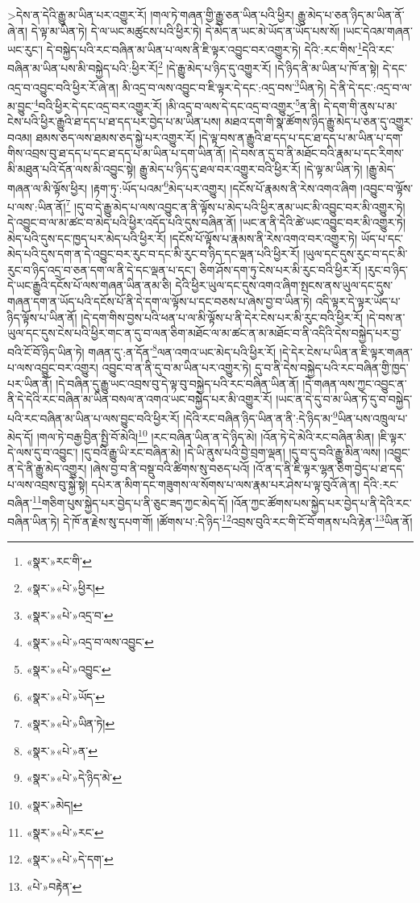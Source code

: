  >དེས་ན་དེའི་རྒྱུ་མ་ཡིན་པར་འགྱུར་རོ། །གལ་ཏེ་གཞན་གྱི་རྒྱུ་ཅན་ཡིན་པའི་ཕྱིར། རྒྱུ་མེད་པ་ཅན་ཉིད་མ་ཡིན་ནོ་ཞེ་ན། དེ་ལྟ་མ་ཡིན་ཏེ། དེ་ལ་ཡང་མཚུངས་པའི་ཕྱིར་ཏེ། དེ་མེད་ན་ཡང་མེ་ཡོད་ན་ཡོད་པས་སོ། །ཡང་དེའམ་གཞན་ཡང་རུང་། དེ་བསྐྱེད་པའི་རང་བཞིན་མ་ཡིན་པ་ལས་ནི་ཇི་ལྟར་འབྱུང་བར་འགྱུར་ཏེ། དེའི་:རང་གིས་\footnote{«སྣར་»རང་གི་}དེའི་རང་བཞིན་མ་ཡིན་པས་མི་བསྐྱེད་པའི་:ཕྱིར་རོ།\footnote{«སྣར་»«པེ་»ཕྱིར།} །དེ་རྒྱུ་མེད་པ་ཉིད་དུ་འགྱུར་རོ། །དེ་ཉིད་ནི་མ་ཡིན་པ་ཁོ་ན་སྟེ། དེ་དང་འདྲ་བ་འབྱུང་བའི་ཕྱིར་རོ་ཞེ་ན། མི་འདྲ་བ་ལས་འབྱུང་བ་ཇི་ལྟར་དེ་དང་:འདྲ་བས་\footnote{«སྣར་»«པེ་»འདྲ་བ་}ཡིན་ཏེ། དེ་ནི་དེ་དང་:འདྲ་བ་ལ་མ་བྱུང་\footnote{«སྣར་»«པེ་»འདྲ་བ་ལས་འབྱུང་}བའི་ཕྱིར་དེ་དང་འདྲ་བར་འགྱུར་རོ། །མི་འདྲ་བ་ལས་དེ་དང་འདྲ་བ་འགྱུར་\footnote{«སྣར་»«པེ་»འབྱུང་}ན་ནི། དེ་དག་གི་ནུས་པ་མ་ངེས་པའི་ཕྱིར་རྒྱུའི་ཐ་དད་པ་ཐ་དད་པར་བྱེད་པ་མ་ཡིན་པས། མཐའ་དག་གི་སྣ་ཚོགས་ཉིད་རྒྱུ་མེད་པ་ཅན་དུ་འགྱུར་བའམ། ཐམས་ཅད་ལས་ཐམས་ཅད་སྐྱེ་པར་འགྱུར་རོ། །དེ་ལྟ་བས་ན་རྒྱུའི་ཐ་དད་པ་དང་ཐ་དད་པ་མ་ཡིན་པ་དག་གིས་འབྲས་བུ་ཐ་དད་པ་དང་ཐ་དད་པ་མ་ཡིན་པ་དག་ཡིན་ནོ། །དེ་བས་ན་དུ་བ་ནི་མཐོང་བའི་རྣམ་པ་དང་རིགས་མི་མཐུན་པའི་དོན་ལས་མི་འབྱུང་སྟེ། རྒྱུ་མེད་པ་ཉིད་དུ་ཐལ་བར་འགྱུར་བའི་ཕྱིར་རོ། །དེ་ལྟ་མ་ཡིན་ཏེ། །རྒྱུ་མེད་གཞན་ལ་མི་ལྟོས་ཕྱིར། །རྟག་ཏུ་:ཡོད་པའམ་\footnote{«སྣར་»«པེ་»ཡོད་}མེད་པར་འགྱུར། །དངོས་པོ་རྣམས་ནི་རེས་འགའ་ཞིག །འབྱུང་བ་ལྟོས་པ་ལས་:ཡིན་ནོ།\footnote{«སྣར་»«པེ་»ཡིན་ཏེ།} །དུ་བ་དེ་རྒྱུ་མེད་པ་ལས་འབྱུང་ན་ནི་ལྟོས་པ་མེད་པའི་ཕྱིར་ནམ་ཡང་མི་འབྱུང་བར་མི་འགྱུར་ཏེ། དེ་འབྱུང་བ་ལ་མ་ཚང་བ་མེད་པའི་ཕྱིར་འདོད་པའི་དུས་བཞིན་ནོ། །ཡང་ན་ནི་དེའི་ཚེ་ཡང་འབྱུང་བར་མི་འགྱུར་ཏེ། མེད་པའི་དུས་དང་ཁྱད་པར་མེད་པའི་ཕྱིར་རོ། །དངོས་པོ་ལྟོས་པ་རྣམས་ནི་རེས་འགའ་བར་འགྱུར་ཏེ། ཡོད་པ་དང་མེད་པའི་དུས་དག་ན་དེ་འབྱུང་བར་རུང་བ་དང་མི་རུང་བ་ཉིད་དང་ལྡན་པའི་ཕྱིར་རོ། །ཡུལ་དང་དུས་རུང་བ་དང་མི་རུང་བ་ཉིད་འདྲ་བ་ཅན་དག་ལ་ནི་དེ་དང་ལྡན་པ་དང་། ཅིག་ཤོས་དག་ཏུ་ངེས་པར་མི་རུང་བའི་ཕྱིར་རོ། །རུང་བ་ཉིད་དེ་ཡང་རྒྱུའི་དངོས་པོ་ལས་གཞན་ཡིན་ནམ་ཅི། དེའི་ཕྱིར་ཡུལ་དང་དུས་འགའ་ཞིག་སྤངས་ནས་ཡུལ་དང་དུས་གཞན་དག་ན་ཡོད་པའི་དངོས་པོ་ནི་དེ་དག་ལ་ལྟོས་པ་དང་བཅས་པ་ཞེས་བྱ་བ་ཡིན་ཏེ། འདི་ལྟར་དེ་ལྟར་ཡོད་པ་ཉིད་ལྟོས་པ་ཡིན་ནོ། །དེ་དག་གིས་བྱས་པའི་ཕན་པ་ལ་མི་ལྟོས་པ་ནི་དེར་ངེས་པར་མི་རུང་བའི་ཕྱིར་རོ། །དེ་བས་ན་ཡུལ་དང་དུས་ངེས་པའི་ཕྱིར་གང་ན་དུ་བ་ལན་ཅིག་མཐོང་ལ་མ་ཚང་ན་མ་མཐོང་བ་ནི་འདིའི་དེས་བསྐྱེད་པར་བྱ་བའི་ངོ་བོ་ཉིད་ཡིན་ཏེ། གཞན་དུ་:ན་དོན་\footnote{«སྣར་»«པེ་»ན་}ལན་འགའ་ཡང་མེད་པའི་ཕྱིར་རོ། །དེ་དེར་ངེས་པ་ཡིན་ན་ཇི་ལྟར་གཞན་པ་ལས་འབྱུང་བར་འགྱུར། འབྱུང་བ་ན་ནི་དུ་བ་མ་ཡིན་པར་འགྱུར་ཏེ། དུ་བ་ནི་དེས་བསྐྱེད་པའི་རང་བཞིན་གྱི་ཁྱད་པར་ཡིན་ནོ། །དེ་བཞིན་དུ་རྒྱུ་ཡང་འབྲས་བུ་དེ་ལྟ་བུ་བསྐྱེད་པའི་རང་བཞིན་ཡིན་ནོ། །དེ་གཞན་ལས་ཀྱང་འབྱུང་ན་ནི་དེ་དེའི་རང་བཞིན་མ་ཡིན་བསལ་ན་འགའ་ཡང་བསྐྱེད་པར་མི་འགྱུར་རོ། །ཡང་ན་དེ་དུ་བ་མ་ཡིན་ཏེ་དུ་བ་བསྐྱེད་པའི་རང་བཞིན་མ་ཡིན་པ་ལས་བྱུང་བའི་ཕྱིར་རོ། །དེའི་རང་བཞིན་ཉིད་ཡིན་ན་ནི་:དེ་ཉིད་མ་\footnote{«སྣར་»«པེ་»དེ་ཉིད་མེ་}ཡིན་པས་འཁྲུལ་པ་མེད་དོ། །གལ་ཏེ་བརྒྱ་བྱིན་སྤྱི་བོ་མེའི།\footnote{«སྣར་»མེད།} །རང་བཞིན་ཡིན་ན་དེ་ཉིད་མེ། །འོན་ཏེ་དེ་མེའི་རང་བཞིན་མིན། །ཇི་ལྟར་དེ་ལས་དུ་བ་འབྱུང་། །དུ་བའི་རྒྱུ་ཡི་རང་བཞིན་མེ། །དེ་ཡི་ནུས་པའི་བྱེ་བྲག་ལྡན། །དུ་བ་དུ་བའི་རྒྱུ་མིན་ལས། །འབྱུང་ན་དེ་ནི་རྒྱུ་མེད་འགྱུར། །ཞེས་བྱ་བ་ནི་བསྡུ་བའི་ཚིགས་སུ་བཅད་པའོ། །འོ་ན་ད་ནི་ཇི་ལྟར་ལྷན་ཅིག་བྱེད་པ་ཐ་དད་པ་ལས་འབྲས་བུ་སྐྱེ་སྟེ། དཔེར་ན་མིག་དང་གཟུགས་ལ་སོགས་པ་ལས་རྣམ་པར་ཤེས་པ་ལྟ་བུའོ་ཞེ་ན། དེའི་:རང་བཞིན་\footnote{«སྣར་»«པེ་»རང་}གཅིག་པུས་སྐྱེད་པར་བྱེད་པ་ནི་ཅུང་ཟད་ཀྱང་མེད་དོ། །འོན་ཀྱང་ཚོགས་པས་སྐྱེད་པར་བྱེད་པ་ནི་དེའི་རང་བཞིན་ཡིན་ཏེ། དེ་ཁོ་ན་རྗེས་སུ་དཔག་གོ། །ཚོགས་པ་:དེ་ཉིད་\footnote{«སྣར་»«པེ་»དེ་དག་}འབྲས་བུའི་རང་གི་ངོ་བོ་གནས་པའི་རྟེན་\footnote{«པེ་»བརྟེན་}ཡིན་ནོ། 